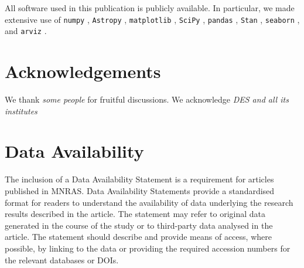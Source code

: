 \documentclass[fleqn,usenatbib]{mnras}
\begin{document}
All software used in this publication is publicly available. In particular, we made extensive use of \texttt{numpy} \citep{Harris2020}, \texttt{Astropy} \citep{AstropyCollaboration2013,AstropyCollaboration2018}, \texttt{matplotlib} \citep{Hunter2007}, \texttt{SciPy} \citep{Virtanen2020}, \texttt{pandas} \citep{Mckinney2010}, \texttt{Stan} \citep{Carpenter2017}, \texttt{seaborn} \citep{Waskom2020}, and \texttt{arviz} \citep{Kumar2019}.

\section*{Acknowledgements}

We thank \textit{some people} for fruitful discussions. 
We acknowledge \textit{DES and all its institutes}

\section*{Data Availability}

 
The inclusion of a Data Availability Statement is a requirement for articles published in MNRAS. Data Availability Statements provide a standardised format for readers to understand the availability of data underlying the research results described in the article. The statement may refer to original data generated in the course of the study or to third-party data analysed in the article. The statement should describe and provide means of access, where possible, by linking to the data or providing the required accession numbers for the relevant databases or DOIs.








\end{document}
